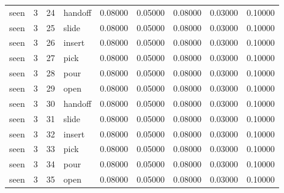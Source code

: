 \documentclass{article}
\begin{document}
\begin{center}
\begin{longtable}{lllllllll}
seen & 3 & 24 & handoff & 0.08000 & 0.05000 & 0.08000 & 0.03000 & 0.10000 \\
seen & 3 & 25 & slide & 0.08000 & 0.05000 & 0.08000 & 0.03000 & 0.10000 \\
seen & 3 & 26 & insert & 0.08000 & 0.05000 & 0.08000 & 0.03000 & 0.10000 \\
seen & 3 & 27 & pick & 0.08000 & 0.05000 & 0.08000 & 0.03000 & 0.10000 \\
seen & 3 & 28 & pour & 0.08000 & 0.05000 & 0.08000 & 0.03000 & 0.10000 \\
seen & 3 & 29 & open & 0.08000 & 0.05000 & 0.08000 & 0.03000 & 0.10000 \\
seen & 3 & 30 & handoff & 0.08000 & 0.05000 & 0.08000 & 0.03000 & 0.10000 \\
seen & 3 & 31 & slide & 0.08000 & 0.05000 & 0.08000 & 0.03000 & 0.10000 \\
seen & 3 & 32 & insert & 0.08000 & 0.05000 & 0.08000 & 0.03000 & 0.10000 \\
seen & 3 & 33 & pick & 0.08000 & 0.05000 & 0.08000 & 0.03000 & 0.10000 \\
seen & 3 & 34 & pour & 0.08000 & 0.05000 & 0.08000 & 0.03000 & 0.10000 \\
seen & 3 & 35 & open & 0.08000 & 0.05000 & 0.08000 & 0.03000 & 0.10000 \\
\bottomrule
\end{longtable}
\renewcommand{\arraystretch}{1.0}
\end{center}




\end{document}
